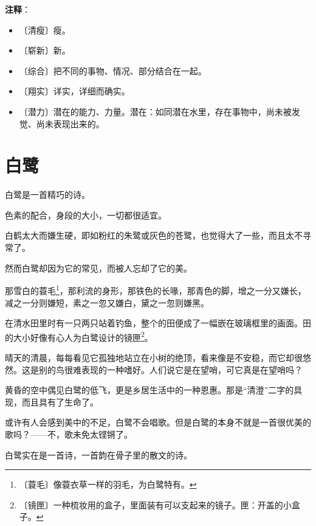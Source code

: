 \documentclass[12pt,UTF-8,openany]{ctexbook}
\begin{document}
\newpage

\textbf{注释}：

\vspace{-1em}

\begin{itemize}
    \setlength\itemsep{-0.2em}
    \item 〔清瘦〕瘦。
    \item 〔崭新〕新。
    \item 〔综合〕把不同的事物、情况、部分结合在一起。
    \item 〔翔实〕详实，详细而确实。
    \item 〔潜力〕潜在的能力、力量。潜在：如同潜在水里，存在事物中，尚未被发觉、尚未表现出来的。
\end{itemize}

\chapter{白鹭}

\begin{large}
    
    白鹭是一首精巧的诗。
    
    色素的配合，身段的大小，一切都很适宜。
    
    白鹤太大而嫌生硬，即如粉红的朱鹭或灰色的苍鹭，也觉得大了一些，而且太不寻常了。
    
    然而白鹭却因为它的常见，而被人忘却了它的美。
    
    那雪白的蓑毛\footnote{〔蓑毛〕像蓑衣草一样的羽毛，为白鹭特有。}，那利流的身形，那铁色的长喙，那青色的脚，增之一分又嫌长，减之一分则嫌短，素之一忽又嫌白，黛之一忽则嫌黑。
    
    在清水田里时有一只两只站着钓鱼，整个的田便成了一幅嵌在玻璃框里的画面。田的大小好像有心人为白鹭设计的镜匣\footnote{〔镜匣〕一种梳妆用的盒子，里面装有可以支起来的镜子。匣：开盖的小盒子。}。
    
    晴天的清晨，每每看见它孤独地站立在小树的绝顶，看来像是不安稳，而它却很悠然。这是别的鸟很难表现的一种嗜好。人们说它是在望哨，可它真是在望哨吗？
    
    黄昏的空中偶见白鹭的低飞，更是乡居生活中的一种恩惠。那是“清澄”二字的具现，而且具有了生命了。
    
    或许有人会感到美中的不足，白鹭不会唱歌。但是白鹭的本身不就是一首很优美的歌吗？——不，歌未免太铿锵了。
    
    白鹭实在是一首诗，一首韵在骨子里的散文的诗。
    
\end{large}
\end{document}
